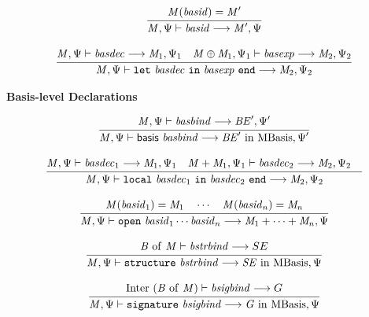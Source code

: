 \documentclass[draft]{article}
\renewcommand{\mit}[1]{\mathit{#1}}
\newcommand{\mrm}[1]{\mathrm{#1}}
\newcommand{\mtt}[1]{\mathtt{#1}}
\newcommand{\msf}[1]{\mathsf{#1}}
\newcommand{\infrule}[2]{{\frac{\displaystyle\strut{#1}}{\displaystyle\strut{#2}}}}
\newcommand{\judge}[2]{\infrule{#1}{#2}}
\begin{document}
\begin{equation}
\judge{
\mit{M}(\mit{basid}) = \mit{M}'
}{
\mit{M}, \Psi \vdash \mit{basid} \longrightarrow \mit{M}', \Psi
}
\end{equation}

\begin{equation}
\judge{
\mit{M}, \Psi \vdash \mit{basdec} \longrightarrow \mit{M}_1, \Psi_1 \quad
\mit{M} \oplus \mit{M}_1, \Psi_1 \vdash \mit{basexp} \longrightarrow \mit{M}_2, \Psi_2
}{
\mit{M}, \Psi \vdash \mtt{let}~ \mit{basdec} ~\mtt{in}~ \mit{basexp} ~\mtt{end} \longrightarrow \mit{M}_2, \Psi_2
}
\end{equation}

\vspace{2\parsep}
{\large\noindent
\textbf{Basis-level Declarations} \hfill 
\fbox{$\mit{M}, \Psi \vdash \mit{basdec} \longrightarrow \mit{M}', \Psi' / p$}
}\nopagebreak

\begin{equation}
\judge{
\mit{M}, \Psi  \vdash \mit{basbind} \longrightarrow \mit{BE}', \Psi'
}{
\mit{M}, \Psi  \vdash \msf{basis}~ \mit{basbind} \longrightarrow \mit{BE}' ~\mrm{in}~ \mrm{MBasis}, \Psi'
}
\end{equation}

\begin{equation}
\judge{
\mit{M}, \Psi  \vdash \mit{basdec}_1 \longrightarrow \mit{M}_1, \Psi_1 \quad
\mit{M} + \mit{M}_1, \Psi_1  \vdash \mit{basdec}_2 \longrightarrow \mit{M}_2, \Psi_2 \quad
}{
\mit{M}, \Psi  \vdash \mtt{local}~ \mit{basdec}_1 ~\mtt{in}~ \mit{basdec}_2 ~\mtt{end} \longrightarrow \mit{M}_2, \Psi_2
}
\end{equation}

\begin{equation}
\judge{
\mit{M}(\mit{basid}_1) = \mit{M}_1 \quad \cdots \quad
\mit{M}(\mit{basid}_n) = \mit{M}_n 
}{
\mit{M}, \Psi  \vdash \mtt{open}~ \mit{basid}_1 \cdots \mit{basid}_n \longrightarrow \mit{M}_1 + \cdots + \mit{M}_n, \Psi
}
\end{equation}

\begin{equation}
\judge{
\mit{B}~\mrm{of}~\mit{M} \vdash \mit{bstrbind} \longrightarrow SE
}{
\mit{M}, \Psi  \vdash \mtt{structure}~ \mit{bstrbind}
\longrightarrow \mit{SE} ~\mrm{in}~ \mrm{MBasis}, \Psi
}
\end{equation}

\begin{equation}
\judge{
\mrm{Inter}~(\mit{B}~\mrm{of}~\mit{M}) \vdash \mit{bsigbind} \longrightarrow G
}{
\mit{M}, \Psi  \vdash \mtt{signature}~ \mit{bsigbind}
\longrightarrow \mit{G } ~\mrm{in}~ \mrm{MBasis}, \Psi
}
\end{equation}
\end{document}
